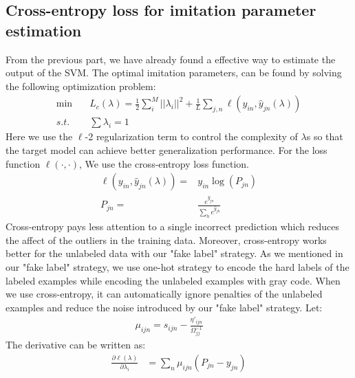\subsection{Cross-entropy loss for imitation parameter estimation}
From the previous part, we have already found a effective way to estimate the output of the SVM. The optimal imitation parameters, can be found by solving the following optimization problem:
\begin{equation}\label{eq:loo_loss}
\begin{aligned}
\min \quad& L_c\left(\lambda\right)=\frac{1}{2}\sum_i^M||\lambda_i||^2+\frac{1}{L}\sum_{j,n}\ell\left(y_{in},\hat{y}_{jn}\left(\lambda\right)\right)\\
s.t. \quad& \sum\lambda_i=1
\end{aligned}
\end{equation}
Here we use the $\ell$-2 regularization term to control the complexity of $\lambda$s so that the target model can achieve better generalization performance. For the loss function $\ell(\cdot,\cdot)$, We use the cross-entropy loss function.
\begin{equation}\label{eq:ce}
\begin{aligned}
\ell\left(y_{in},\hat{y}_{jn}\left(\lambda\right)\right)=&y_{in}\log(P_{jn})\\
P_{jn} =& \frac{e^{\hat{y}_{jn}}}{\sum_{h} e^{\hat{y}_{jh}}}
\end{aligned}
\end{equation}
Cross-entropy pays less attention to a single incorrect prediction which reduces the affect of the outliers in the training data. Moreover, cross-entropy works better for the unlabeled data with our "fake label" strategy. As we mentioned in our "fake label" strategy, we use one-hot strategy to encode the hard labels of the labeled examples while encoding the unlabeled examples with gray code. When we use cross-entropy, it can automatically ignore penalties of the unlabeled examples and reduce the noise introduced by our "fake label" strategy. 
Let:
\begin{equation}\label{eq:mu}
\begin{aligned}
\mu_{ijn}=s_{ijn}-\frac{{\eta}'_{ijn}}{\Omega_{jj}^{-1}} \qquad
\end{aligned}
\end{equation}
The derivative can be written as:
\begin{equation}\label{eq:p}
\begin{aligned}
\frac{\partial \ell(\lambda)}{\partial \lambda_i}&=\sum_n\mu_{ijn}\left(P_{jn}-{y}_{jn}\right)
\end{aligned}
\end{equation}
